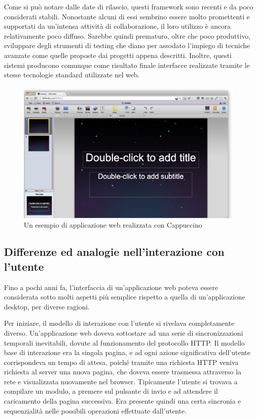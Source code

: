 \documentclass[12pt]{toptesi}
\begin{document}
Come si può notare dalle date di rilascio, questi framework sono recenti e da poco considerati stabili. Nonostante alcuni di essi sembrino essere molto promettenti e supportati da un'intensa attività di collaborazione, il loro utilizzo è ancora relativamente poco diffuso. Sarebbe quindi prematuro, oltre che poco produttivo, sviluppare degli strumenti di testing che diano per assodato l'impiego di tecniche avanzate come quelle proposte dai progetti appena descritti. Inoltre, questi sistemi producono comunque come risultato finale interfacce realizzate tramite le stesse tecnologie standard utilizzate nel web.

\begin{figure}[htbp]
\begin{center}
\includegraphics[width=\textwidth]{images/cappuccino_example_app.png}
\caption{Un esempio di applicazione web realizzata con Cappuccino}
\label{default}
\end{center}
\end{figure}


\subsection{Differenze ed analogie nell'interazione con l'utente}

Fino a pochi anni fa, l'interfaccia di un'applicazione web poteva essere considerata sotto molti aspetti più semplice rispetto a quella di un'applicazione desktop, per diverse ragioni.

Per iniziare, il modello di interazione con l'utente si rivelava completamente diverso. Un'applicazione web doveva sottostare ad una serie di sincronizzazioni temporali inevitabili, dovute al funzionamento del protocollo HTTP. Il modello base di interazione era la singola pagina, e ad ogni azione significativa dell'utente corrispondeva un tempo di attesa, poiché tramite una richiesta HTTP veniva richiesta al server una nuova pagina, che doveva essere trasmessa attraverso la rete e visualizzata nuovamente nel browser. Tipicamente l'utente si trovava a compilare un modulo, a premere sul pulsante di invio e ad attendere il caricamento della pagina successiva. Era presente quindi una certa sincronia e sequenzialità nelle possibili operazioni effettuate dall'utente. 
\end{document}
